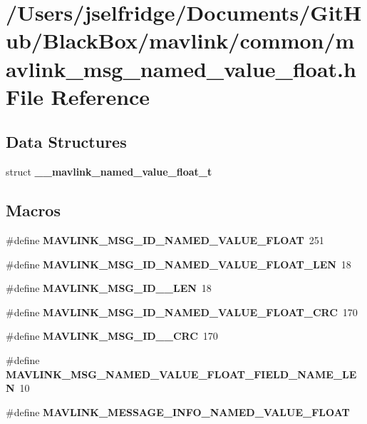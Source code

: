\section{/\+Users/jselfridge/\+Documents/\+Git\+Hub/\+Black\+Box/mavlink/common/mavlink\+\_\+msg\+\_\+named\+\_\+value\+\_\+float.h File Reference}
\label{mavlink__msg__named__value__float_8h}
\subsection*{Data Structures}
\begin{DoxyCompactItemize}
\item 
struct \textbf{ \+\_\+\+\_\+mavlink\+\_\+named\+\_\+value\+\_\+float\+\_\+t}
\end{DoxyCompactItemize}
\subsection*{Macros}
\begin{DoxyCompactItemize}
\item 
\#define \textbf{ M\+A\+V\+L\+I\+N\+K\+\_\+\+M\+S\+G\+\_\+\+I\+D\+\_\+\+N\+A\+M\+E\+D\+\_\+\+V\+A\+L\+U\+E\+\_\+\+F\+L\+O\+AT}~251
\item 
\#define \textbf{ M\+A\+V\+L\+I\+N\+K\+\_\+\+M\+S\+G\+\_\+\+I\+D\+\_\+\+N\+A\+M\+E\+D\+\_\+\+V\+A\+L\+U\+E\+\_\+\+F\+L\+O\+A\+T\+\_\+\+L\+EN}~18
\item 
\#define \textbf{ M\+A\+V\+L\+I\+N\+K\+\_\+\+M\+S\+G\+\_\+\+I\+D\+\_\+\_\+\+L\+EN}~18
\item 
\#define \textbf{ M\+A\+V\+L\+I\+N\+K\+\_\+\+M\+S\+G\+\_\+\+I\+D\+\_\+\+N\+A\+M\+E\+D\+\_\+\+V\+A\+L\+U\+E\+\_\+\+F\+L\+O\+A\+T\+\_\+\+C\+RC}~170
\item 
\#define \textbf{ M\+A\+V\+L\+I\+N\+K\+\_\+\+M\+S\+G\+\_\+\+I\+D\+\_\+\_\+\+C\+RC}~170
\item 
\#define \textbf{ M\+A\+V\+L\+I\+N\+K\+\_\+\+M\+S\+G\+\_\+\+N\+A\+M\+E\+D\+\_\+\+V\+A\+L\+U\+E\+\_\+\+F\+L\+O\+A\+T\+\_\+\+F\+I\+E\+L\+D\+\_\+\+N\+A\+M\+E\+\_\+\+L\+EN}~10
\item 
\#define \textbf{ M\+A\+V\+L\+I\+N\+K\+\_\+\+M\+E\+S\+S\+A\+G\+E\+\_\+\+I\+N\+F\+O\+\_\+\+N\+A\+M\+E\+D\+\_\+\+V\+A\+L\+U\+E\+\_\+\+F\+L\+O\+AT}
\end{DoxyCompactItemize}
